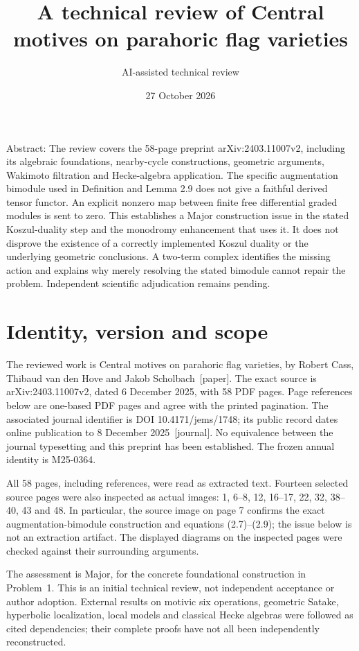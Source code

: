 \documentclass[10pt]{article}
\title{A technical review of
Central motives on parahoric flag varieties}
\author{AI-assisted technical review}
\date{27 October 2026}
\begin{document}
\maketitle
Abstract: The review covers the 58-page preprint arXiv:2403.11007v2, including its algebraic foundations, nearby-cycle constructions, geometric arguments, Wakimoto filtration and Hecke-algebra application. The specific augmentation bimodule used in Definition and Lemma 2.9 does not give a faithful derived tensor functor. An explicit nonzero map between finite free differential graded modules is sent to zero. This establishes a Major construction issue in the stated Koszul-duality step and the monodromy enhancement that uses it. It does not disprove the existence of a correctly implemented Koszul duality or the underlying geometric conclusions. A two-term complex identifies the missing action and explains why merely resolving the stated bimodule cannot repair the problem. Independent scientific adjudication remains pending.\par
\section*{Identity, version and scope}
The reviewed work is Central motives on parahoric flag varieties, by Robert Cass, Thibaud van den Hove and Jakob Scholbach [paper]. The exact source is arXiv:2403.11007v2, dated 6 December 2025, with 58 PDF pages. Page references below are one-based PDF pages and agree with the printed pagination. The associated journal identifier is DOI 10.4171/jems/1748; its public record dates online publication to 8 December 2025 [journal]. No equivalence between the journal typesetting and this preprint has been established. The frozen annual identity is M25-0364.\par
All 58 pages, including references, were read as extracted text. Fourteen selected source pages were also inspected as actual images: 1, 6–8, 12, 16–17, 22, 32, 38–40, 43 and 48. In particular, the source image on page 7 confirms the exact augmentation-bimodule construction and equations (2.7)–(2.9); the issue below is not an extraction artifact. The displayed diagrams on the inspected pages were checked against their surrounding arguments.\par
The assessment is Major, for the concrete foundational construction in Problem 1. This is an initial technical review, not independent acceptance or author adoption. External results on motivic six operations, geometric Satake, hyperbolic localization, local models and classical Hecke algebras were followed as cited dependencies; their complete proofs have not all been independently reconstructed.\par
\end{document}
